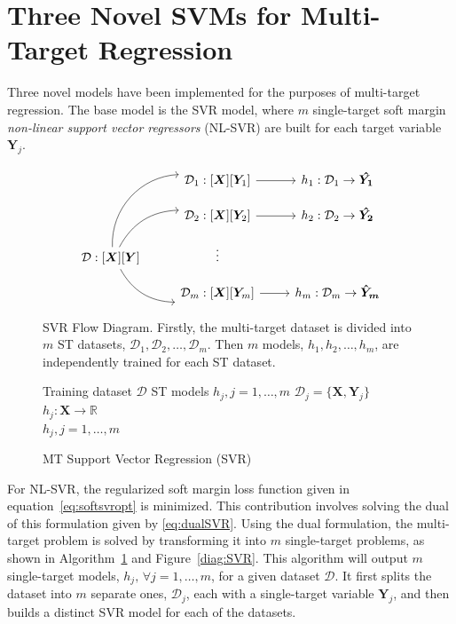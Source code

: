 \documentclass[reqno]{vcuthesis}
\numberwithin{equation}{chapter}
\begin{document}
\section{Three Novel SVMs for Multi-Target Regression}\label{sec:MTRproposal}
Three novel models have been implemented for the purposes of multi-target regression. The base model is the SVR model, where $m$ single-target soft margin \textit{non-linear support vector regressors} (NL-SVR) are built for each target variable $\bm Y_j$. 
\begin{figure}[b!]
\begin{minipage}{0.9\textwidth}
\small \centering
\[\begin{tikzcd}[column sep = small, row sep = small]
& & \mathcal{D}_1 :  [\bm X][\bm Y_1]  \arrow[rr]  & & h_1 :  \mathcal{D}_1 \rightarrow \bm{\hat{Y_1}}\\
& & \mathcal{D}_2 :  [\bm X][\bm Y_2]  \arrow[rr] & & h_2 :  \mathcal{D}_2 \rightarrow \bm{\hat{Y_2}} \\        
\mathcal{D} :  [\bm X][\bm Y]  \arrow[uurr, bend left=45] \arrow[urr, bend left] \arrow[drr, bend right]  		& & \vdots \\
& & \mathcal{D}_m :  [\bm X][\bm Y_m] \arrow[rr] & & h_m :  \mathcal{D}_m \rightarrow \bm{\hat{Y}_m}
\end{tikzcd}\]
\end{minipage}
\caption{\small SVR Flow Diagram. Firstly, the multi-target dataset is divided into $m$ ST datasets, $\mathcal{D}_1, \mathcal{D}_2, \ldots, \mathcal{D}_m$. Then $m$ models, $h_1, h_2, \ldots, h_m$, are independently trained for each ST dataset.}\label{diag:SVR}
\begin{algorithm}[H]
\caption{MT Support Vector Regression (SVR)} \label{alg:SVR} 
\small \centering
\begin{algorithmic}[1]
\renewcommand{\algorithmicrequire}{\textbf{Input:}}
\renewcommand{\algorithmicensure}{\textbf{Output:}}
\Require Training dataset $\mathcal{D}$
\Ensure  ST models $h_j, j = 1,\ldots,m$
\State $\mathcal{D}_j = \{\bm X, \bm Y_j\}$ 
\State $h_j : \bm X \rightarrow \mathbb{R}$ 
\EndFor \\
\Return $h_j, j=1,\ldots,m$ 
\end{algorithmic} 
\end{algorithm}
\end{figure}

For NL-SVR, the regularized soft margin loss function given in equation~\eqref{eq:softsvropt} is minimized. This contribution involves solving the dual of this formulation given by \eqref{eq:dualSVR}. Using the dual formulation, the multi-target problem is solved by transforming it into $m$ single-target problems, as shown in Algorithm~\ref{alg:SVR} and Figure~\ref{diag:SVR}. This algorithm will output $m$ single-target models, $h_j,\,\forall j = 1,\ldots,m$, for a given dataset $\mathcal{D}$. It first splits the dataset into $m$ separate ones, $\mathcal{D}_j$, each with a single-target variable $\bm Y_j$, and then builds a distinct SVR model for each of the datasets. 
\end{document}
